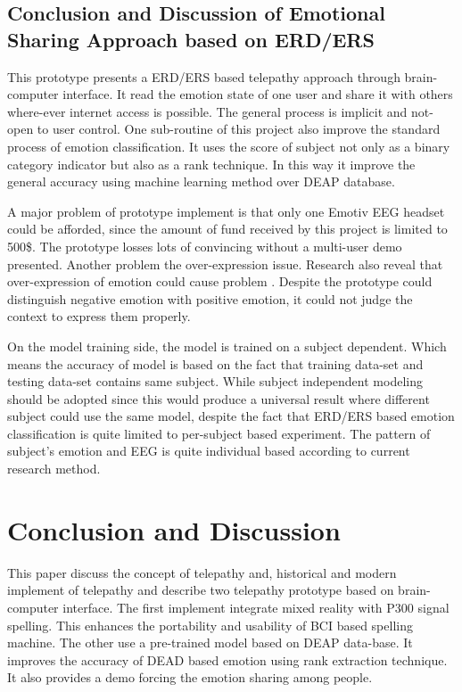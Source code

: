 \documentclass[a4paper]{article}
\begin{document}
\subsection{Conclusion and Discussion of Emotional Sharing Approach based on ERD/ERS}

This prototype presents a ERD/ERS based telepathy approach through brain-computer interface. It read the emotion state of one user and share it with others where-ever internet access is possible. The general process is implicit and not-open to user control. One sub-routine of this project also improve the standard process of emotion classification. It uses the score of subject not only as a binary category indicator but also as a rank technique. In this way it improve the general accuracy using machine learning method over DEAP database.

A major problem of prototype implement is that only one Emotiv EEG headset could be afforded, since the amount of fund received by this project is limited to 500\$. The prototype losses lots of convincing without a multi-user demo presented. Another problem the over-expression issue. Research also reveal that over-expression of emotion could cause problem \autocite{bonanno2004importance}. Despite the prototype could distinguish negative emotion with positive emotion, it could not judge the context to express them properly.

On the model training side, the model is trained on a subject dependent. Which means the accuracy of model is based on the fact that training data-set and testing data-set contains same subject. While subject independent modeling should be adopted since this would produce a universal result where different subject could use the same model, despite the fact that ERD/ERS based emotion classification is quite limited to per-subject based experiment. The pattern of subject's emotion and EEG is quite individual based according to current research method.

\section{Conclusion and Discussion}

This paper discuss the concept of telepathy and, historical and modern implement of telepathy and describe two telepathy prototype based on brain-computer interface. The first implement integrate mixed reality with P300 signal spelling. This enhances the portability and usability of BCI based spelling machine. The other use a pre-trained model based on DEAP data-base. It improves the accuracy of DEAD based emotion using rank extraction technique. It also provides a demo forcing the emotion sharing among people. 
\end{document}
